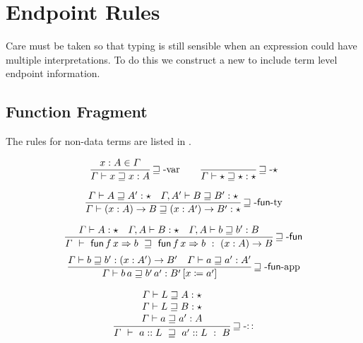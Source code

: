 \section{Endpoint Rules}

Care must be taken so that typing is still sensible when an expression could have multiple interpretations.
To do this we construct a new \csys{} to include term level endpoint information.

\subsection{Function Fragment}
The rules for non-data terms are listed in .

\begin{figure}

\begin{align*}
 \frac{x:A\in\varGamma}{\varGamma\vdash x\sqsupseteq x:A}\rulename{\sqsupseteq-var}
  \quad & \quad 
  \frac{\ }{\varGamma\vdash\star\sqsupseteq\star:\star}\rulename{\sqsupseteq-\star}
  \\
\end{align*}

\[
\frac{
\varGamma\vdash A\sqsupseteq A':\star \quad
\varGamma,A'\vdash B\sqsupseteq B':\star
}{
  \varGamma\vdash\left(x:A\right)\rightarrow B\sqsupseteq\left(x:A'\right)\rightarrow B':\star
}\operatorname{\sqsupseteq-\mathsf{fun}-ty}
\]

\[
\frac{
\varGamma\vdash A:\star\quad\varGamma,A\vdash B:\star \quad
\varGamma,A\vdash b\sqsupseteq b':B
}{
  \varGamma\ \vdash\ \mathsf{fun}\,f\,x\Rightarrow b\ \sqsupseteq\ \mathsf{fun}\,f\,x\Rightarrow b\ :\ \left(x:A\right)\rightarrow B
}\rulename{\sqsupseteq-\mathsf{fun}}
\]
\[
\frac{
\varGamma\vdash b\sqsupseteq b':\left(x:A'\right)\rightarrow B' \quad
\varGamma\vdash a\sqsupseteq a':A'
}{
  \varGamma\vdash b\,a\sqsupseteq b'\,a':B'\left[x\coloneqq a'\right]
}\operatorname{\sqsupseteq-\mathsf{fun}-app}
\]

\[
\frac{\begin{array}{c}
  \varGamma\vdash L\sqsupseteq A:\star\\
  \varGamma\vdash L\sqsupseteq B:\star\\
  \varGamma\vdash a\sqsupseteq a':A
  \end{array}}{\varGamma\ \vdash\ a::L\ \sqsupseteq\ a'::L\ :\ B}\rulename{\sqsupseteq-::}
\]


\end{figure}
